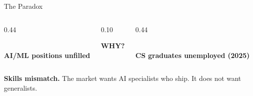 \begin{frame}{The Paradox}
\vspace{0.4em}
\begin{columns}[c]
  \begin{column}{0.44\textwidth}
    \begin{center}
      {\fontsize{52}{58}\selectfont{}}\\[0.3em]
      {\normalsize\bfseries AI/ML positions unfilled}\\[0.2em]
      {\footnotesize{}}
    \end{center}
  \end{column}
  \begin{column}{0.10\textwidth}
    \begin{center}
      {\Large\bfseries\color{primarygold} WHY?}
    \end{center}
  \end{column}
  \begin{column}{0.44\textwidth}
    \begin{center}
      {\fontsize{52}{58}\selectfont{}}\\[0.3em]
      {\normalsize\bfseries CS graduates unemployed (2025)}\\[0.2em]
      {\footnotesize{}}
    \end{center}
  \end{column}
\end{columns}
\vspace{1.2em}
\begin{highlightbox}[]
  \centering
  {\bfseries Skills mismatch.}
  The market wants AI specialists who ship. It does not want generalists.
\end{highlightbox}
\end{frame}

